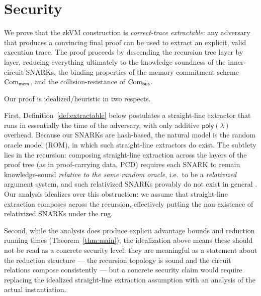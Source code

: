 \section{Security}\label{sec:security}

We prove that the zkVM construction is \emph{correct-trace extractable}: any
adversary that produces a convincing final proof can be used to extract an
explicit, valid execution trace.  The proof proceeds by descending the recursion
tree layer by layer, reducing everything ultimately to the knowledge soundness
of the inner-circuit SNARKs, the binding properties
of the memory commitment scheme $\mathrm{Com}_{\mathsf{mem}}$, and the collision-resistance of $\mathrm{Com}_{\mathsf{bus}}$.

\begin{remark}\label{rem:idealized}
Our proof is idealized/heuristic in two respects.

First, Definition~\ref{def:extractable} below postulates a straight-line
extractor that runs in essentially the time of the adversary, with only
additive $\mathsf{poly}(\lambda)$ overhead. Because our SNARKs are hash-based,
the natural model is the random oracle model (ROM), in which such
straight-line extractors do exist. The subtlety lies in the recursion:
composing straight-line extraction across the layers of the proof tree (as in
proof-carrying data, PCD) requires each SNARK to remain knowledge-sound
\emph{relative to the same random oracle}, i.e.\ to be a \emph{relativized}
argument system, and such relativized SNARKs provably do not exist in general
\cite{EPRINT:relativized}. Our analysis idealizes over this obstruction: we assume that straight-line extraction composes across the
recursion, effectively putting the non-existence of relativized SNARKs under
the rug.

Second, while the analysis does produce explicit advantage bounds and reduction
running times (Theorem~\ref{thm:main}), the idealization above means these
should not be read as a concrete security level: they are meaningful as a
statement about the reduction structure --- the recursion topology is sound and
the circuit relations compose consistently --- but a concrete security claim
would require replacing the idealized straight-line extraction assumption with
an analysis of the actual instantiation.
\end{remark}

